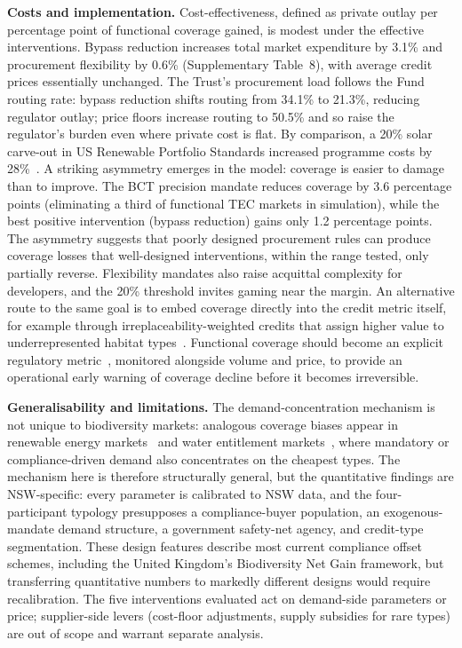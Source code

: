 \documentclass[pdflatex,sn-nature,oneside]{sn-jnl}
\begin{document}
\textbf{Costs and implementation.}
Cost-effectiveness, defined as private outlay per percentage point of
functional coverage gained, is modest under the effective interventions. Bypass
reduction increases total market expenditure by 3.1\% and procurement
flexibility by 0.6\% (Supplementary Table~8), with average credit prices
essentially unchanged. The Trust's procurement load follows the Fund
routing rate: bypass reduction shifts routing from 34.1\% to 21.3\%,
reducing regulator outlay; price floors increase routing to 50.5\% and so
raise the regulator's burden even where private cost is flat. By
comparison, a 20\% solar carve-out in US Renewable Portfolio Standards
increased programme costs by 28\%~\cite{NovacheckJohnson2015}.
A striking asymmetry emerges in the model: coverage is easier to damage
than to improve. The BCT precision mandate reduces coverage by 3.6
percentage points (eliminating a third of functional TEC markets in
simulation), while the best positive intervention (bypass reduction)
gains only 1.2 percentage points. The asymmetry suggests that poorly
designed procurement rules can produce coverage losses that
well-designed interventions, within the range tested, only partially
reverse.
Flexibility mandates also raise acquittal complexity for developers, and the
20\% threshold invites gaming near the margin.
An alternative route to the same goal is to embed coverage
directly into the credit metric itself, for example through
irreplaceability-weighted credits that assign higher value to
underrepresented habitat types~\cite{Bush2024}.
Functional coverage should become an explicit regulatory
metric~\cite{Needham2019}, monitored alongside volume and price, to provide an
operational early warning of coverage decline before it becomes irreversible.

\textbf{Generalisability and limitations.}
The demand-concentration mechanism is not unique to biodiversity markets:
analogous coverage biases appear in renewable energy
markets~\cite{ZhouSolomonBrown2024} and water entitlement
markets~\cite{DonnaEspinSanchez2026}, where mandatory or
compliance-driven demand also concentrates on the cheapest types. The
mechanism here is therefore structurally general, but the quantitative
findings are NSW-specific: every parameter is calibrated to NSW data, and
the four-participant typology presupposes a compliance-buyer population,
an exogenous-mandate demand structure, a government safety-net agency,
and credit-type segmentation. These design features describe most
current compliance offset schemes, including the United Kingdom's
Biodiversity Net Gain framework, but transferring quantitative numbers to
markedly different designs would require recalibration.
The five interventions evaluated act on demand-side parameters or price;
supplier-side levers (cost-floor adjustments, supply subsidies for rare
types) are out of scope and warrant separate analysis.
\end{document}
